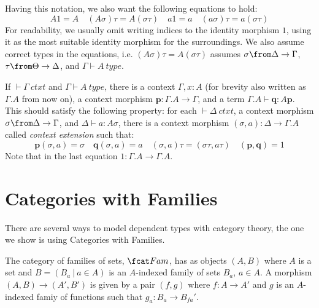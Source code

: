 Having this notation, we also want the following equations to hold:
\[
  A1=A \quad (A\sigma)\tau = A(\sigma\tau) \quad a1=a \quad (a\sigma)\tau=a(\sigma\tau)
\]
For readability, we usually omit writing indices to the identity morphism $1$,
using it as the most suitable identity morphism for the surroundings. We also
assume correct types in the equations, i.e. $(A\sigma)\tau = A(\sigma\tau)$
assumes $\sigma \from \Delta \to \Gamma$, $\tau \from \Theta \to \Delta$, and
$\Gamma \vdash A~type$.

\begin{definition}
  If $\vdash \Gamma~ctxt$ and $\Gamma \vdash A~type$, there is a context
  $\Gamma, x:A$ (for brevity also written as $\Gamma.A$ from now on), a context
  morphism $\mathbf{p}: \Gamma.A \to \Gamma$, and a term $\Gamma.A \vdash
  \mathbf{q} : A \mathbf{p}$. This should satisfy the following property: for
  each $\vdash \Delta~ctxt$, a context morphism $\sigma \from \Delta \to
  \Gamma$, and $\Delta \vdash a : A \sigma$, there is a context morphism
  $(\sigma, a): \Delta \to \Gamma.A$ called \emph{context extension} such that:
  \[
    \mathbf{p}(\sigma, a) = \sigma \quad \mathbf{q}(\sigma, a) = a \quad (\sigma, a) \tau =
    (\sigma \tau, a \tau) \quad (\mathbf{p}, \mathbf{q}) = 1
  \]
  Note that in the last equation $1: \Gamma.A \to \Gamma.A$.
\end{definition}

\section*{Categories with Families}

There are several ways to model dependent types with category theory, the one
we show is using Categories with Families.

\begin{definition}
  The category of families of sets, $\Fam$, has as objects $(A, B)$ where
  $A$ is a set and $B = (B_a~|~a \in A)$ is an $A$-indexed family of sets $B_a$,
  $a \in A$. A morphism $(A, B) \to (A', B')$ is given by a pair $(f, g)$ where
  $f: A \to A'$ and $g$ is an $A$-indexed famiy of functions such that $g_a: B_a
  \to B_{fa}'$.
\end{definition}


